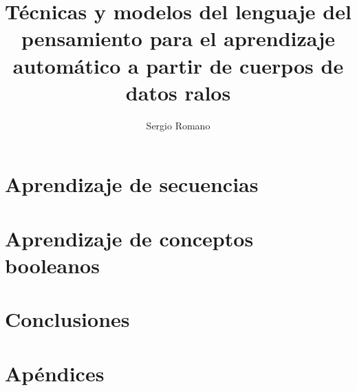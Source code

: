 \documentclass[a4paper,12pt,oneside,spanish]{book}
\title{Técnicas y modelos del lenguaje del pensamiento para el aprendizaje automático a partir de cuerpos de datos ralos}
\author{Sergio Romano}
\begin{document}
    
\restoregeometry 

    
    
    
    
\tableofcontents


\setlength{\parskip}{0.5em}

    
    \part{Aprendizaje de secuencias}\label{parte:secuencias}
        
        
        
    \part{Aprendizaje de conceptos booleanos}\label{parte:conceptos}
        
        
        
    \part{Conclusiones}
        
    \part{Apéndices}
        \appendix
        
        
        
    
    
    
    
\end{document}
